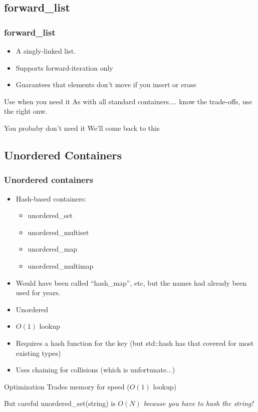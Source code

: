 \subsection{forward\_list}
\begin{frame}[fragile]
\frametitle{forward\_list}
\begin{itemize}
\item A singly-linked list.
\item Supports forward-iteration only
\item Guarantees that elements don't move if you insert or erase
\end{itemize}
\begin{block}{Use when you need it}
As with all standard containers.... know the trade-offs, use the right onw.
\end{block}
\begin{alertblock}{You probaby don't need it}
We'll come back to this
\end{alertblock}
\end{frame}


\subsection{Unordered Containers}
\begin{frame}[fragile]
\frametitle{Unordered containers}
\begin{itemize}
\item Hash-based containers:
  \begin{itemize}
  \item unordered\_set
  \item unordered\_multiset
  \item unordered\_map
  \item unordered\_multimap
  \end{itemize}
\item Would have been called ``hash\_map'', etc, but the names had
  already been used for years.
\item Unordered
\item $O(1)$ lookup
\item Requires a hash function for the key (but std::hash has that
  covered for most existing types)
\item Uses chaining for collisions (which is unfortunate...)
\end{itemize}
\begin{exampleblock}{Optimization}
Trades memory for speed ($O(1)$ lookup)
\end{exampleblock}
\begin{alertblock}{But careful}
unordered\_set(string) is $O(N)$ \emph{because you have to hash the string!}
\end{alertblock}
\end{frame}

